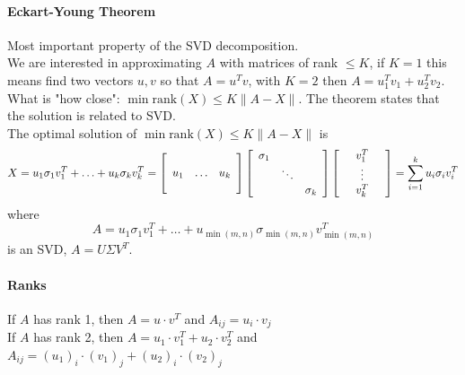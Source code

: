 \documentclass[10pt]{report}
\begin{document}
\paragraph{Eckart-Young Theorem} Most important property of the SVD decomposition.\\
We are interested in approximating $A$ with matrices of rank $\leq K$, if $K = 1$ this means find two vectors $u, v$ so that $A = u^T v$, with $K=2$ then $A = u_1^T v_1 + u_2^T v_2$. What is "how close": $\min{\text{rank}(X) \leq K}\|A - X\|$. The theorem states that the solution is related to SVD.\\
The optimal solution of $\min \text{rank}(X) \leq K\|A - X\|$ is $$X = u_1\sigma_1 v_1^T + \ldots + u_k\sigma_k v_k^T = \left[\begin{array}{c c c}
\\
u_1&\ldots&u_k\\
\\
\end{array}\right]\left[\begin{array}{c c c}
\sigma_1\\
&\ddots\\
&&\sigma_k
\end{array}\right]\left[\begin{array}{c c c}
&v_1^T&\\&\vdots&\\&v_k^T&
\end{array}\right] = \sum_{i=1}^ku_i\sigma_iv_i^T$$
where $$A = u_1\sigma_1 v_1^T + \ldots + u_{\min(m,n)}\sigma_{\min(m,n)} v_{\min(m,n)}^T$$ is an SVD, $A = U\Sigma V^T$.
\paragraph{Ranks} If $A$ has rank 1, then $A = u\cdot v^T$ and $A_{ij} = u_i\cdot v_j$\\
If $A$ has rank 2, then $A= u_1\cdot v_1^T + u_2\cdot v_2^T$ and $A_{ij} = (u_1)_i\cdot (v_1)_j + (u_2)_i\cdot (v_2)_j$
\end{document}
